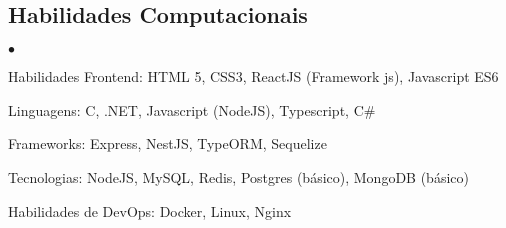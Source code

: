\documentclass[margin,line]{res}
\newenvironment{list2}{
 \begin{list}{$\bullet$}{%
     \setlength{\itemsep}{0in}
     \setlength{\parsep}{0in} \setlength{\parskip}{0in}
     \setlength{\topsep}{0in} \setlength{\partopsep}{0in}
     \setlength{\leftmargin}{0.2in}}}{\end{list}}
\begin{document}
\begin{resume}
\section{Habilidades Computacionais}
\begin{list2}
\item Habilidades Frontend: HTML 5, CSS3, ReactJS (Framework js), Javascript ES6

\item Linguagens: C, .NET, Javascript (NodeJS), Typescript, C\#

\item Frameworks: Express, NestJS, TypeORM, Sequelize

\item Tecnologias: NodeJS, MySQL, Redis, Postgres (básico), MongoDB (básico)

\item Habilidades de DevOps: Docker, Linux, Nginx
\end{list2}
\end{resume}
\end{document}
